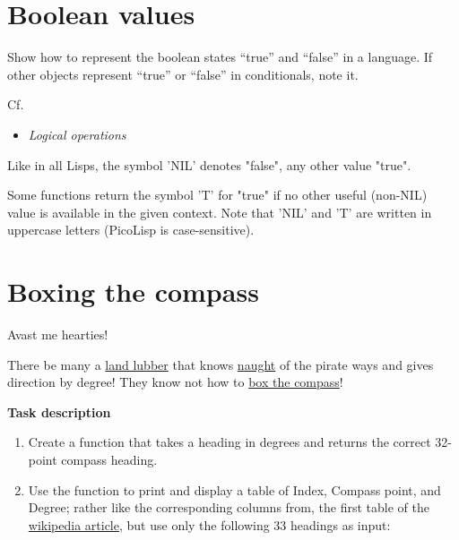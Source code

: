 \pagebreak{}
\section*{Boolean values}


Show how to represent the boolean states ``true'' and ``false'' in a
language. If other objects represent ``true'' or ``false'' in
conditionals, note it.

Cf.

\begin{itemize}
\item
  \emph{Logical operations}
\end{itemize}



\begin{wideverbatim}

Like in all Lisps, the symbol 'NIL' denotes "false", any other value "true".

Some functions return the symbol 'T' for "true" if no other useful (non-NIL)
value is available in the given context. Note that 'NIL' and 'T' are written in
uppercase letters (PicoLisp is case-sensitive).

\end{wideverbatim}

\pagebreak{}
\section*{Boxing the compass}

Avast me hearties!

There be many a \href{http://www.talklikeapirate.com/howto.html}{land
lubber} that knows
\href{http://oxforddictionaries.com/view/entry/m\_en\_gb0550020\#m\_en\_gb0550020}{naught}
of the pirate ways and gives direction by degree! They know not how to
\href{http://en.wikipedia.org/wiki/Boxing\_the\_compass}{box the
compass}!

\textbf{Task description}

\begin{enumerate}
\item
  Create a function that takes a heading in degrees and returns the
  correct 32-point compass heading.
\item
  Use the function to print and display a table of Index, Compass point,
  and Degree; rather like the corresponding columns from, the first
  table of the
  \href{http://en.wikipedia.org/wiki/Boxing\_the\_compass}{wikipedia
  article}, but use only the following 33 headings as input:
\end{enumerate}

